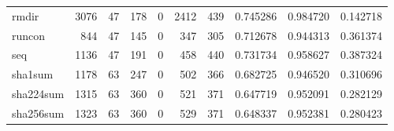 \begin{tabular}{lrrrrrrrrr}
rmdir     &                                3076 &                                              47 &                                            178 &                                             0 &                                           2412 &                                          439 &                                           0.745286 &                               0.984720 &                             0.142718 \\
runcon    &                                 844 &                                              47 &                                            145 &                                             0 &                                            347 &                                          305 &                                           0.712678 &                               0.944313 &                             0.361374 \\
seq       &                                1136 &                                              47 &                                            191 &                                             0 &                                            458 &                                          440 &                                           0.731734 &                               0.958627 &                             0.387324 \\
sha1sum   &                                1178 &                                              63 &                                            247 &                                             0 &                                            502 &                                          366 &                                           0.682725 &                               0.946520 &                             0.310696 \\
sha224sum &                                1315 &                                              63 &                                            360 &                                             0 &                                            521 &                                          371 &                                           0.647719 &                               0.952091 &                             0.282129 \\
sha256sum &                                1323 &                                              63 &                                            360 &                                             0 &                                            529 &                                          371 &                                           0.648337 &                               0.952381 &                             0.280423 \\

\end{tabular}
